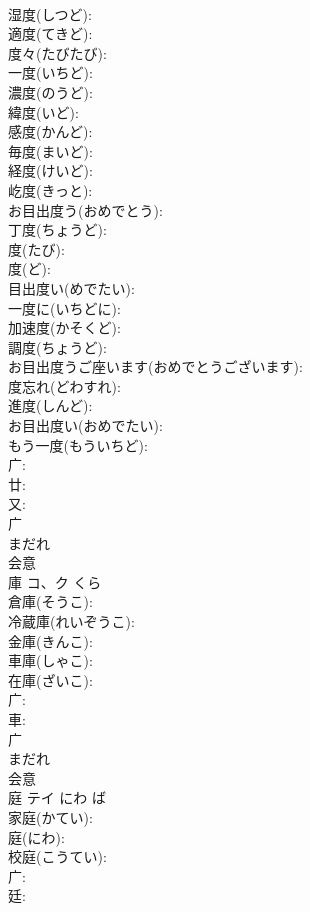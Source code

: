 \documentclass[8pt]{extreport}
\begin{document}
\begin{CJK}{UTF8}{min}
\\	湿度(しつど): 
\\	適度(てきど): 
\\	度々(たびたび): 
\\	一度(いちど): 
\\	濃度(のうど): 
\\	緯度(いど): 
\\	感度(かんど): 
\\	毎度(まいど): 
\\	経度(けいど): 
\\	屹度(きっと): 
\\	お目出度う(おめでとう): 
\\	丁度(ちょうど): 
\\	度(たび): 
\\	度(ど): 
\\	目出度い(めでたい): 
\\	一度に(いちどに): 
\\	加速度(かそくど): 
\\	調度(ちょうど): 
\\	お目出度うご座います(おめでとうございます): 
\\	度忘れ(どわすれ): 
\\	進度(しんど): 
\\	お目出度い(おめでたい): 
\\	もう一度(もういちど): 
\\	广: 
\\	廿: 
\\	又: 
\\	广	
\\	まだれ	
\\	会意 
\\	庫	コ、ク	くら		
\\	倉庫(そうこ): 
\\	冷蔵庫(れいぞうこ): 
\\	金庫(きんこ): 
\\	車庫(しゃこ): 
\\	在庫(ざいこ): 
\\	广: 
\\	車: 
\\	广	
\\	まだれ	
\\	会意 
\\	庭	テイ	にわ	ば	
\\	家庭(かてい): 
\\	庭(にわ): 
\\	校庭(こうてい): 
\\	广: 
\\	廷: 

\end{CJK}
\end{document}
